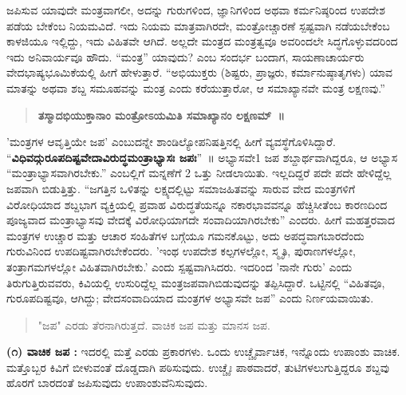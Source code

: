 ಜಪಿಸುವ ಯಾವುದೇ ಮಂತ್ರವಾಗಲೀ, ಅದನ್ನು ಗುರುಗಳಿಂದ, ಜ್ಞಾನಿಗಳಿಂದ ಅಥವಾ ಕರ್ಮನಿಷ್ಠರಿಂದ ಉಪದೇಶ ಪಡೆಯ ಬೇಕೆಂಬ ನಿಯಮವಿದೆ. ಇದು ನಿಯಮ ಮಾತ್ರವಾಗಿರದೇ, ಮಂತ್ರೋಚ್ಚಾರಣೆ ಸ್ಪಷ್ಟವಾಗಿ ನಡೆಯಬೇಕೆಂಬ ಕಾಳಜಿಯೂ ಇಲ್ಲಿದ್ದು, ಇದು ವಿಹಿತವೇ ಆಗಿದೆ. ಅಲ್ಲದೇ ಮಂತ್ರದ ಮಂತ್ರತ್ವವೂ ಅವರಿಂದಲೇ ಸಿದ್ಧಗೊಳ್ಳುವದರಿಂದ ಇದು ಅನಿವಾರ್ಯವೂ ಹೌದು. “ಮಂತ್ರ” ಯಾವುದು? ಎಂಬ ಸಂದರ್ಭ ಬಂದಾಗ, ಸಾಯಣಾಚಾರ್ಯರು ವೇದಭಾಷ್ಯಭೂಮಿಕೆಯಲ್ಲಿ ಹೀಗೆ ಹೇಳುತ್ತಾರೆ. “ಅಭಿಯುಕ್ತರು (ಶಿಷ್ಟರು, ಪ್ರಾಜ್ಞರು, ಕರ್ಮಾನುಷ್ಠಾತೃಗಳು) ಯಾವ ಮಾತನ್ನು ಅಥವಾ ಶಬ್ದ ಸಮೂಹವನ್ನು ಮಂತ್ರ ಎಂದು ಕರೆಯುತ್ತಾರೋ, ಆ ಸಮಾಖ್ಯಾನವೇ ಮಂತ್ರ ಲಕ್ಷಣವು.” 
\begin{verse}
\textbf{ತಸ್ಮಾದಭಿಯುಕ್ತಾನಾಂ ಮಂತ್ರೋಽಯಮಿತಿ ಸಮಾಖ್ಯಾನಂ ಲಕ್ಷಣಮ್~॥}
\end{verse}
’ಮಂತ್ರಗಳ ಆವೃತ್ತಿಯೇ ಜಪ’ ಎಂಬುದನ್ನೇ ಶಾಂಡಿಲ್ಯೋಪನಿಷತ್ತಿನಲ್ಲಿ ಹೀಗೆ ವ್ಯವಸ್ಥೆಗೊಳಿಸಿದ್ದಾರೆ. “\textbf{ವಿಧಿವದ್ಗು\-ರೂಪದಿಷ್ಟವೇದಾವಿರುದ್ಧಮಂತ್ರಾಭ್ಯಾಸಃ ಜಪಃ}”~॥ ಅಭ್ಯಾಸವೇ1 ಜಪ ಶಬ್ದಾರ್ಥವಾಗಿದ್ದರೂ, ಆ ಅಭ್ಯಾಸ “ಮಂತ್ರಾಭ್ಯಾಸವಾಗಿರಬೇಕು.” ಎಂಬಲ್ಲಿಗೆ ಮನ್ನಣೆಗೆ 2 ಒತ್ತು ನೀಡಲಾಯಿತು. ಇಲ್ಲದಿದ್ದರೆ ಪದೇ ಪದೇ ಹೇಳಿದ್ದೆಲ್ಲ ಜಪವಾಗಿ ಬಿಡುತ್ತಿತ್ತು. “ಜಗತ್ತಿನ ಒಳಿತನ್ನು ಲಕ್ಷ್ಯದಲ್ಲಿಟ್ಟು ಸಮಾಜಹಿತವನ್ನು ಸಾರುವ ವೇದ ಮಂತ್ರಗಳಿಗೆ ವಿರೋಧಿಯಾದ ಶಬ್ದಭಾಗ ವ್ಯಕ್ತಿಯಲ್ಲಿ ಪ್ರವಾಹ ವಿರುದ್ಧತೆಯನ್ನೂ ನಕಾರಭಾವವನ್ನೂ ಹೆಚ್ಚಿಸೀತೆಂಬ ಕಾರಣದಿಂದ ಪೂಜ್ಯವಾದ ಮಂತ್ರಾಭ್ಯಾಸವು ವೇದಕ್ಕೆ ವಿರೋಧಿಯಾಗದೇ ಸಂವಾದಿಯಾಗಿರಬೇಕು” ಎಂದರು. ಹೀಗೆ ಮಹತ್ತರವಾದ ಮಂತ್ರಗಳ ಉಚ್ಚಾರ ಮತ್ತು ಆಚಾರ ಸಂಹಿತೆಗಳ ಬಗ್ಗೆಯೂ ಗಮನಕೊಟ್ಟು, ಅದು ಅಪದ್ಧವಾಗಬಾರದೆಂದು ಗುರುವಿನಿಂದ ಉಪದಿಷ್ಟವಾಗಿರಬೇಕೆಂದರು. ’ಇಂಥ ಉಪದೇಶ ಕಲ್ಪಗಳಲ್ಲೋ, ಸ್ಮೃತಿ, ಪುರಾಣಗಳಲ್ಲೋ, ತಂತ್ರಾಗಮಗಳಲ್ಲೋ ವಿಹಿತವಾಗಿರಬೇಕು.’ ಎಂದು ಸ್ಪಷ್ಟವಾಗಿಸಿದರು. ಇದರಿಂದ ’ನಾನೇ ಗುರು’ ಎಂದು ತಿರುಗುತ್ತಿರುವವರು, ಕಿವಿಯಲ್ಲಿ ಉಸುರಿದ್ದೆಲ್ಲ ಮಂತ್ರಜಪವಾಗಿಬಿಡುವುದನ್ನು ತಪ್ಪಿಸಿದ್ದಾರೆ. ಒಟ್ಟಿನಲ್ಲಿ “ವಿಹಿತವೂ, ಗುರೂಪದಿಷ್ಟವೂ, ಆಗಿದ್ದು; ವೇದಸಂವಾದಿಯಾದ ಮಂತ್ರಗಳ ಅಭ್ಯಾಸವೇ ಜಪ” ಎಂದು ನಿರ್ಣಯವಾಯಿತು.
\begin{verse}
"ಜಪ" ಎರಡು ತೆರನಾಗಿರುತ್ತದೆ. ವಾಚಿಕ ಜಪ ಮತ್ತು ಮಾನಸ ಜಪ.
\end{verse}
\textbf{(೧) ವಾಚಿಕ ಜಪ :} ಇದರಲ್ಲಿ ಮತ್ತೆ ಎರಡು ಪ್ರಕಾರಗಳು. ಒಂದು ಉಚ್ಚೈರ್ವಾಚಿಕ, ಇನ್ನೊಂದು ಉಪಾಂಶು ವಾಚಿಕ. ಮತ್ತೊಬ್ಬರ ಕಿವಿಗೆ ಬೀಳುವಂತೆ ದೊಡ್ಡದಾಗಿ ಪಠಿಸುವುದು. ಉಚ್ಚೈಃ ಪಾಠವಾದರೆ, ತುಟಿಗಳಲುಗುತ್ತಿದ್ದರೂ ಶಬ್ದವು ಹೊರಗೆ ಬಾರದಂತೆ ಜಪಿಸುವುದು ಉಪಾಂಶುವೆನಿಸುವುದು.

